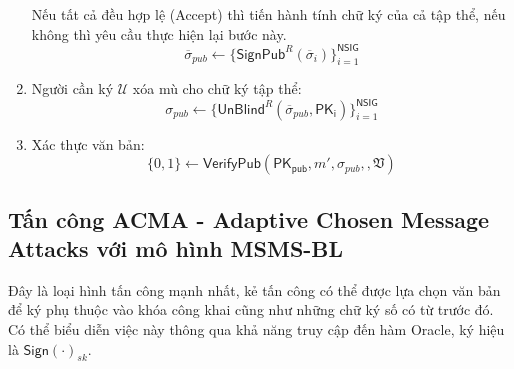 \begin{defi}
\begin{enumerate}[label=(\arabic*)]
\begin{equation}
		\end{equation}
		Nếu tất cả đều hợp lệ (Accept) thì tiến hành tính chữ ký của cả tập thể, nếu không thì yêu cầu thực hiện lại bước này.
		\begin{equation}
		\overline{\sigma}_{pub} \gets \{\boldsymbol{\mathsf{SignPub}}^R(\overline{\sigma}_i)\}^{\mathsf{NSIG}}_{i=1}
		\end{equation}
		\item Người cần ký $\boldsymbol{\mathcal{U}}$ xóa mù cho chữ ký tập thể:
		\begin{equation}
		\sigma_{pub} \gets \{\boldsymbol{\mathsf{UnBlind}}^R(\overline{\sigma}_{pub},\mathsf{PK_i})\}^{\mathsf{NSIG}}_{i=1}
		\end{equation}
		\item Xác thực văn bản:
		\begin{equation}
		\{0,1\} \gets \boldsymbol{\mathsf{VerifyPub}}(\mathsf{PK_{pub}},m',\sigma_{pub},,\mathfrak{V})  
		\end{equation}
	\end{enumerate}
\end{defi}

\subsection{Tấn công ACMA - Adaptive Chosen Message Attacks với mô hình MSMS-BL}
Đây là loại hình tấn công mạnh nhất, kẻ tấn công có thể được lựa chọn văn bản để ký phụ thuộc vào khóa công khai cũng như những chữ ký số có từ trước đó. Có thể biểu diễn việc này thông qua khả năng truy cập đến hàm Oracle, ký hiệu là $\mathsf{Sign(\cdot)}_{sk}$.


